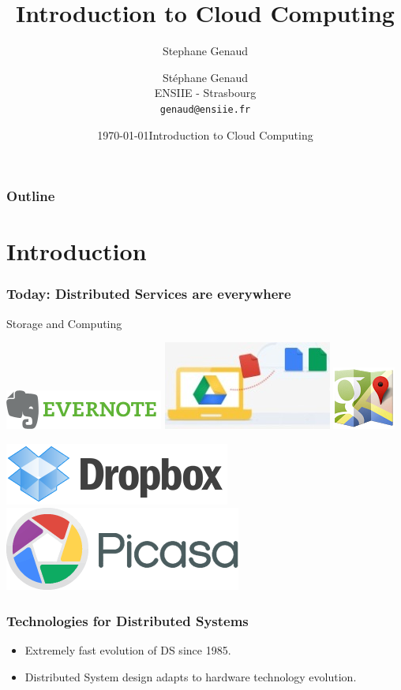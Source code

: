 \documentclass[bigger,hyperref={colorlinks=true, urlcolor=red, plainpages=false, pdfpagelabels, bookmarksnumbered}]{beamer}
\title{Introduction to Cloud Computing}
\author{Stephane Genaud}
\date{\today}
\author[S. Genaud]{{\large Stéphane Genaud} \\ \vspace{0.2cm} ENSIIE - Strasbourg \\ \vspace{0.2cm} \texttt{genaud@ensiie.fr} }
\date{{\large Introduction to Cloud Computing} \\ \vspace{0.2cm} }
\begin{document}
\maketitle

\begin{frame}
\frametitle{Outline}
\setcounter{tocdepth}{3}
\tableofcontents
\end{frame}





\section{Introduction}
\label{sec-1}
\begin{frame}
\frametitle{Today: Distributed Services are everywhere}
\label{sec-1-1}
\begin{block}{Storage and Computing}
\label{sec-1-1-1}

   \includegraphics[width=.25\textwidth]{img/logo_evernote.png}
   \includegraphics[width=.19\textwidth]{img/logo_google_doc.jpg}
   \includegraphics[width=.12\textwidth]{img/logo_google_maps.png}


   \includegraphics[width=.25\textwidth]{img/logo_dropbox.png}
   \includegraphics[width=.25\textwidth]{img/logo_picasa.png}
\end{block}
\end{frame}
\begin{frame}
\frametitle{Technologies for Distributed Systems}
\label{sec-1-2}

\begin{itemize}
\item Extremely fast evolution of DS since 1985.
\item Distributed System design adapts to hardware technology evolution.
\end{itemize}
\end{frame}
\end{document}
